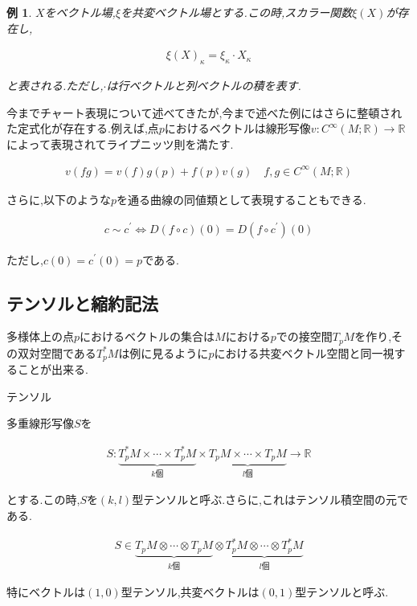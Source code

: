 \documentclass{jsarticle}
\newtheorem{exm}{例}
\begin{document}
\begin{exm} 
  
$X$をベクトル場,$\xi$を共変ベクトル場とする.この時,スカラー関数$\xi(X)$が存在し,

\begin{align}
\xi(X)_\kappa=\xi_\kappa \cdot X_\kappa
\end{align}

と表される.ただし,$\cdot$は行ベクトルと列ベクトルの積を表す.

\end{exm}

今までチャート表現について述べてきたが,今まで述べた例にはさらに整頓された定式化が存在する.例えば,点$p$におけるベクトルは線形写像$v:C^\infty(M;\mathbb{R})\to\mathbb{R}$によって表現されてライプニッツ則を満たす.

\begin{align}
v(fg)=v(f)g(p)+f(p)v(g)\quad f,g\in C^\infty(M;\mathbb{R})
\end{align}

さらに,以下のような$p$を通る曲線の同値類として表現することもできる.

\begin{align}
c\sim c^\prime \Leftrightarrow D(f\circ c)(0)=D(f \circ c^\prime)(0)
\end{align}

ただし,$c(0)=c^\prime(0)=p$である.


\subsection{テンソルと縮約記法}

多様体上の点$p$におけるベクトルの集合は$M$における$p$での接空間$T_pM$を作り,その双対空間である$T_p^*M$は例に見るように$p$における共変ベクトル空間と同一視することが出来る.

\begin{itembox}[l]{テンソル}

多重線形写像$S$を

\begin{align}
S:\underbrace{T_p^*M \times \cdots \times T_p^*M}_{k\text{個}}\times \underbrace{T_pM \times \cdots \times T_pM}_{l\text{個}}\to \mathbb{R}
\end{align}

とする.この時,$S$を$(k,l)$型テンソルと呼ぶ.さらに,これはテンソル積空間の元である.

\begin{align}
S \in \underbrace{T_pM \otimes \cdots \otimes T_pM}_{k\text{個}}\otimes\underbrace{T_p^*M \otimes \cdots \otimes T_p^*M}_{l\text{個}}
\end{align}

特にベクトルは$(1,0)$型テンソル,共変ベクトルは$(0,1)$型テンソルと呼ぶ.

\end{itembox}
\end{document}
